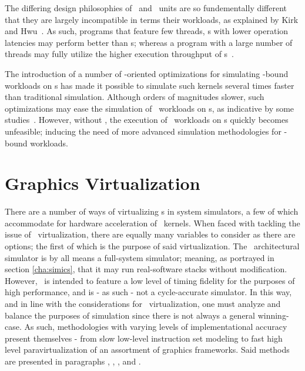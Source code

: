 The differing design philosophies of \dvttermcpu\ and \dvttermgpu\ units are so fundementally different that they are largely incompatible in terms their workloads, as explained by Kirk and Hwu~.
As such, programs that feature few threads, \dvttermcpu s with lower operation latencies may perform better than \dvttermgpu s; whereas a program with a large number of threads may fully utilize the higher execution throughput of \dvttermgpu s~.

The introduction of a number of \dvttermcpu -oriented optimizations for simulating \dvttermgpu -bound workloads on \dvttermcpu s has made it possible to simulate such kernels several times faster than traditional simulation.
Although orders of magnitudes slower, such optimizations may ease the simulation of \dvttermgpu\ workloads on \dvttermcpu s, as indicative by some studies~.
However, without \dvttermhostvirtualizationextensions , the execution of \dvttermgpu\ workloads on \dvttermcpu s quickly becomes unfeasible; inducing the need of more advanced simulation methodologies for \dvttermgpu -bound workloads.

\section{Graphics Virtualization}
\label{sec:backgroundandrelatedwork_graphicsvirtualization}
There are a number of ways of virtualizing \dvttermgpu s in system simulators, a few of which accommodate for hardware acceleration of \dvttermgpu\ kernels.
When faced with tackling the issue of \dvttermgpu\ virtualization, there are equally many variables to consider as there are options; the first of which is the purpose of said virtualization.
The \dvttermsimics\ architectural simulator is by all means a full-system simulator; meaning, as portrayed in section \ref{cha:simics}, that it may run real-software stacks without modification.
However, \dvttermsimics\ is intended to feature a low level of timing fidelity for the purposes of high performance, and is - as such - not a cycle-accurate simulator.
In this way, and in line with the considerations for \dvttermgpu\ virtualization, one must analyze and balance the purposes of simulation since there is not always a general winning-case.
As such, methodologies with varying levels of implementational accuracy present themselves - from slow low-level instruction set modeling to fast high level paravirtualization of an assortment of graphics frameworks.
Said methods are presented in paragraphs , , , and .

